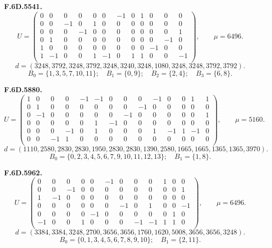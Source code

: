 \par\medskip\noindent\begin{minipage}{\linewidth}\textbf{F.6D.5541.}
\begingroup\small\setlength{\arraycolsep}{3pt}
\[U=\begin{pmatrix}
0 & 0 & 0 & 0 & 0 & 0 & -1 & 0 & 1 & 0 & 0 & 0\\
0 & 0 & -1 & 0 & 1 & 0 & 0 & 0 & 0 & 0 & 0 & 0\\
0 & 0 & 0 & -1 & 0 & 0 & 0 & 0 & 0 & 0 & 0 & 1\\
0 & 1 & 0 & 0 & 0 & 0 & 0 & 0 & 0 & 0 & -1 & 0\\
1 & 0 & 0 & 0 & 0 & 0 & 0 & 0 & 0 & -1 & 0 & 0\\
1 & -1 & 0 & 0 & 1 & -1 & 0 & 1 & 1 & 0 & 0 & -1\\
\end{pmatrix},\qquad \mu=6496.\]
\[d=(3248,3792,3248,3792,3248,3240,3248,1080,3248,3248,3792,3792).\]
\[B_0=\{1,3,5,7,10,11\};\quad B_1=\{0,9\};\quad B_2=\{2,4\};\quad B_3=\{6,8\}.\]
\endgroup\end{minipage}\par
\par\medskip\noindent\begin{minipage}{\linewidth}\textbf{F.6D.5880.}
\begingroup\small\setlength{\arraycolsep}{3pt}
\[U=\begin{pmatrix}
1 & 0 & 0 & 0 & -1 & -1 & 0 & 0 & 0 & -1 & 0 & 0 & 1 & 1\\
0 & 1 & 0 & 0 & 0 & 0 & 0 & 0 & -1 & 0 & 0 & 0 & 0 & 0\\
0 & -1 & 0 & 0 & 0 & 0 & 0 & -1 & 0 & 0 & 0 & 0 & 0 & 1\\
0 & 0 & 0 & 0 & 0 & 1 & -1 & 0 & 0 & 0 & 0 & 0 & 0 & 0\\
0 & 0 & 0 & -1 & 0 & 1 & 0 & 0 & 0 & 1 & -1 & 1 & -1 & 0\\
0 & 0 & -1 & 1 & 0 & 0 & 0 & 0 & 0 & 0 & 0 & 0 & 0 & 0\\
\end{pmatrix},\qquad \mu=5160.\]
\[d=(1110,2580,2830,2830,1950,2830,2830,1390,2580,1665,1665,1365,1365,3970).\]
\[B_0=\{0,2,3,4,5,6,7,9,10,11,12,13\};\quad B_1=\{1,8\}.\]
\endgroup\end{minipage}\par
\par\medskip\noindent\begin{minipage}{\linewidth}\textbf{F.6D.5962.}
\begingroup\small\setlength{\arraycolsep}{3pt}
\[U=\begin{pmatrix}
0 & 0 & 0 & 0 & 0 & -1 & 0 & 0 & 0 & 1 & 0 & 0\\
0 & 0 & -1 & 0 & 0 & 0 & 0 & 0 & 0 & 0 & 0 & 1\\
1 & -1 & 0 & 0 & 0 & 0 & 0 & 0 & 0 & 0 & 0 & 0\\
0 & 0 & 0 & 0 & 0 & 0 & -1 & 0 & 1 & 0 & 0 & -1\\
0 & 0 & 0 & 0 & -1 & 0 & 0 & 0 & 0 & 0 & 1 & 0\\
-1 & 0 & 0 & 1 & 0 & 0 & 0 & -1 & -1 & 1 & 1 & 0\\
\end{pmatrix},\qquad \mu=6496.\]
\[d=(3384,3384,3248,2700,3656,3656,1760,1620,5008,3656,3656,3248).\]
\[B_0=\{0,1,3,4,5,6,7,8,9,10\};\quad B_1=\{2,11\}.\]
\endgroup\end{minipage}\par
